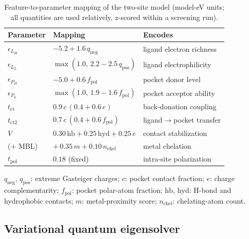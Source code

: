 \documentclass[10pt,twocolumn]{article}
\begin{document}
\begin{table}[t]
\centering
\small
\caption{Feature-to-parameter mapping of the two-site model (model-eV units; all
quantities are used relatively, z-scored within a screening run).}
\label{tab:params}
\begin{tabular*}{\columnwidth}{@{\extracolsep{\fill}}lll@{}}
\toprule
Parameter & Mapping & Encodes \\
\midrule
$\epsilon_{L_H}$ & $-5.2 + 1.6\,q_{\mathrm{neg}}$ & ligand electron richness \\
$\epsilon_{L_L}$ & $\max(1.0,\,2.2 - 2.5\,q_{\mathrm{pos}})$ & ligand electrophilicity \\
$\epsilon_{P_H}$ & $-5.0 + 0.6\,f_{\mathrm{pol}}$ & pocket donor level \\
$\epsilon_{P_L}$ & $\max(1.0,\,1.9 - 1.6\,f_{\mathrm{pol}})$ & pocket acceptor ability \\
$t_{\mathrm{ct}}$ & $0.9\,c\,(0.4+0.6\,e)$ & back-donation coupling \\
$t_{\mathrm{ct2}}$ & $0.7\,c\,(0.4+0.6\,f_{\mathrm{pol}})$ & ligand$\to$pocket transfer \\
$V$ & $0.30\,\mathrm{hb} + 0.25\,\mathrm{hyd} + 0.25\,e$ & contact stabilization \\
\quad($+$ MBL) & $+\,0.35\,m + 0.10\,n_{\mathrm{chel}}$ & metal chelation \\
$t_{\mathrm{pol}}$ & $0.18$ (fixed) & intra-site polarization \\
\bottomrule
\end{tabular*}
\par\smallskip
{\footnotesize $q_{\mathrm{neg}}$, $q_{\mathrm{pos}}$: extreme Gasteiger charges;
$c$: pocket contact fraction; $e$: charge complementarity; $f_{\mathrm{pol}}$:
pocket polar-atom fraction; $\mathrm{hb}$, $\mathrm{hyd}$: H-bond and hydrophobic
contacts; $m$: metal-proximity score; $n_{\mathrm{chel}}$: chelating-atom count.}
\end{table}

\subsection{Variational quantum eigensolver}
\end{document}

